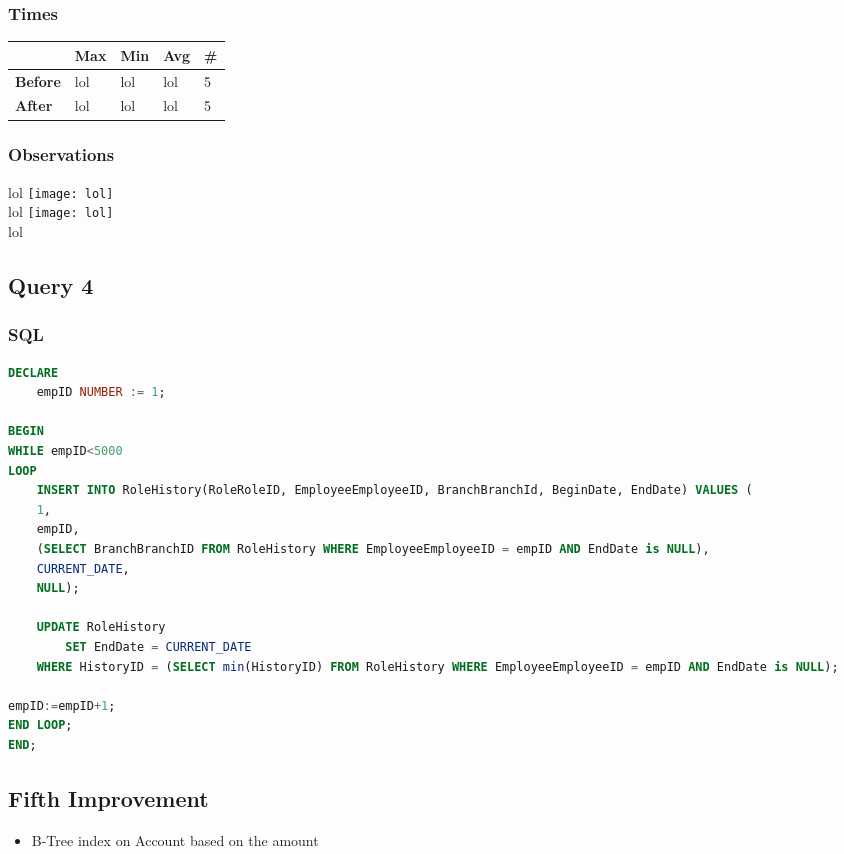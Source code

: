 \documentclass[a4paper, 10pt]{article}
\begin{document}
\subsubsection{Times}
\begin{table}[H]
\begin{tabular}{l|l|l|l|l|}
\cline{2-5}
\textbf{}                             & \textbf{Max} & \textbf{Min} & \textbf{Avg} & \textbf{\#}  \\ \hline
\multicolumn{1}{|l|}{\textbf{Before}} & lol         & lol         & lol          & 5            \\ \hline
\multicolumn{1}{|l|}{\textbf{After}}  & lol         & lol         & lol          & 5            \\ \hline
\end{tabular}
\end{table}
\subsubsection{Observations}
lol
\texttt{[image: lol]}\\ 
lol
\texttt{[image: lol]}\\
lol

\subsection{Query 4}
\subsubsection{SQL}
\begin{lstlisting}[language=SQL]
DECLARE 
    empID NUMBER := 1;

BEGIN
WHILE empID<5000
LOOP
    INSERT INTO RoleHistory(RoleRoleID, EmployeeEmployeeID, BranchBranchId, BeginDate, EndDate) VALUES (
    1,
    empID,
    (SELECT BranchBranchID FROM RoleHistory WHERE EmployeeEmployeeID = empID AND EndDate is NULL),
    CURRENT_DATE,
    NULL);

    UPDATE RoleHistory
        SET EndDate = CURRENT_DATE
    WHERE HistoryID = (SELECT min(HistoryID) FROM RoleHistory WHERE EmployeeEmployeeID = empID AND EndDate is NULL);

empID:=empID+1;
END LOOP;
END;
\end{lstlisting}

\subsection{Fifth Improvement}
\begin{itemize}
  \item B-Tree index on Account based on the amount
\end{itemize}
\end{document}
